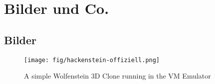 %
%








\section{Bilder und Co.}

\subsection{Bilder}%
\label{sec:figures}

\begin{figure}[h]
  \texttt{[image: fig/hackenstein-offiziell.png]}
  \caption{A simple Wolfenstein 3D Clone running in the VM Emulator}%
  \label{fig:hackenstein-offiziell}
\end{figure}


